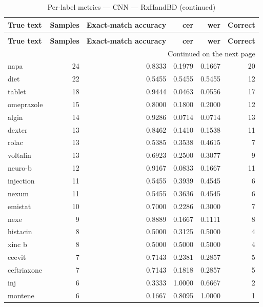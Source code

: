 \begingroup
\setlength{\tabcolsep}{2.5pt}
\renewcommand{\arraystretch}{1.05}
\sloppy
\scriptsize
\begin{longtable}{p{3.0cm}rrrrr}
\caption{Per-label metrics — CNN — RxHandBD}\label{tab:e1-02cnn_evaluation-per-label}\\
\toprule
\textbf{True text} & \textbf{Samples} & \textbf{Exact-match accuracy} & \textbf{cer} & \textbf{wer} & \textbf{Correct} \\
\midrule
\endfirsthead
\caption*{Per-label metrics — CNN — RxHandBD (continued)}\\
\toprule
\textbf{True text} & \textbf{Samples} & \textbf{Exact-match accuracy} & \textbf{cer} & \textbf{wer} & \textbf{Correct} \\
\midrule
\endhead
\midrule
\multicolumn{6}{r}{Continued on the next page}\\
\endfoot
\bottomrule
\endlastfoot
napa & 24 & 0.8333 & 0.1979 & 0.1667 & 20 \\
diet & 22 & 0.5455 & 0.5455 & 0.5455 & 12 \\
tablet & 18 & 0.9444 & 0.0463 & 0.0556 & 17 \\
omeprazole & 15 & 0.8000 & 0.1800 & 0.2000 & 12 \\
algin & 14 & 0.9286 & 0.0714 & 0.0714 & 13 \\
dexter & 13 & 0.8462 & 0.1410 & 0.1538 & 11 \\
rolac & 13 & 0.5385 & 0.3538 & 0.4615 & 7 \\
voltalin & 13 & 0.6923 & 0.2500 & 0.3077 & 9 \\
neuro-b & 12 & 0.9167 & 0.0833 & 0.1667 & 11 \\
injection & 11 & 0.5455 & 0.3939 & 0.4545 & 6 \\
nexum & 11 & 0.5455 & 0.3636 & 0.4545 & 6 \\
emistat & 10 & 0.7000 & 0.2286 & 0.3000 & 7 \\
nexe & 9 & 0.8889 & 0.1667 & 0.1111 & 8 \\
histacin & 8 & 0.5000 & 0.3125 & 0.5000 & 4 \\
xinc b & 8 & 0.5000 & 0.5000 & 0.5000 & 4 \\
ceevit & 7 & 0.7143 & 0.2381 & 0.2857 & 5 \\
ceftriaxone & 7 & 0.7143 & 0.1818 & 0.2857 & 5 \\
inj & 6 & 0.3333 & 1.0000 & 0.6667 & 2 \\
montene & 6 & 0.1667 & 0.8095 & 1.0000 & 1 \\

\end{longtable}
